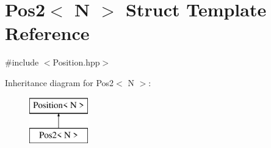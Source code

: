 \hypertarget{struct_pos2}{\section{Pos2$<$ N $>$ Struct Template Reference}
\label{struct_pos2}
}


{\ttfamily \#include $<$Position.\-hpp$>$}

Inheritance diagram for Pos2$<$ N $>$\-:\begin{figure}[H]
\begin{center}
\leavevmode
\includegraphics[height=2.000000cm]{struct_pos2}
\end{center}
\end{figure}
